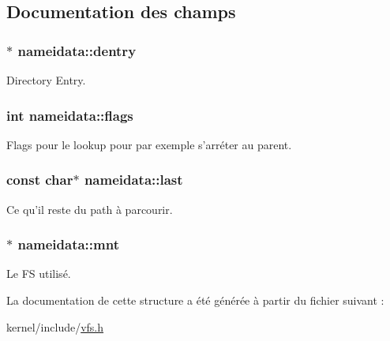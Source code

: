 \subsection{\-Documentation des champs}
\hypertarget{structnameidata_a19b1de01d7a6f689707fa7079cb54d7c}{
\subsubsection[{dentry}]{$\ast$ {\bf nameidata\-::dentry}}}\label{structnameidata_a19b1de01d7a6f689707fa7079cb54d7c}
\-Directory \-Entry. \hypertarget{structnameidata_a9064ec2b4dd712691e3c7442e48ce798}{
\subsubsection[{flags}]{\setlength{\rightskip}{0pt plus 5cm}int {\bf nameidata\-::flags}}}\label{structnameidata_a9064ec2b4dd712691e3c7442e48ce798}
\-Flags pour le lookup pour par exemple s'arréter au parent. \hypertarget{structnameidata_a4a11e098a53839c36c2a0a4e732f8037}{
\subsubsection[{last}]{\setlength{\rightskip}{0pt plus 5cm}const char$\ast$ {\bf nameidata\-::last}}}\label{structnameidata_a4a11e098a53839c36c2a0a4e732f8037}
\-Ce qu'il reste du path à parcourir. \hypertarget{structnameidata_a5488ed23ef4b37b431921f71b15e1f19}{
\subsubsection[{mnt}]{$\ast$ {\bf nameidata\-::mnt}}}\label{structnameidata_a5488ed23ef4b37b431921f71b15e1f19}
\-Le \-F\-S utilisé. 

\-La documentation de cette structure a été générée à partir du fichier suivant \-:\begin{DoxyCompactItemize}
\item 
kernel/include/\hyperlink{vfs_8h}{vfs.\-h}\end{DoxyCompactItemize}
